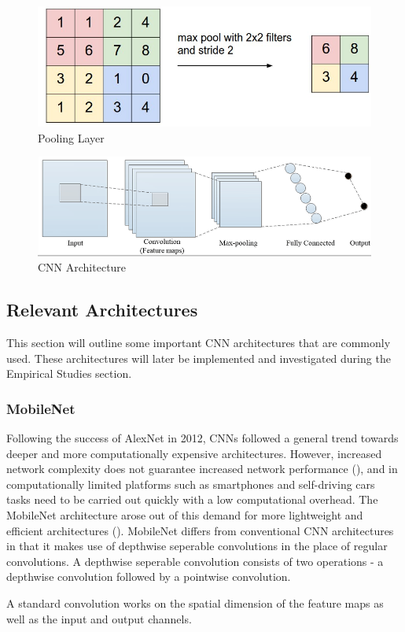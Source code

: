 \documentclass[12pt]{report}
\begin{document}
\vspace{0.5cm}
\begin{figure}[ht!]
	\centering
	\includegraphics[width=12cm]{pool}
	\caption{Pooling Layer}
	\label{fig:pool}
\end{figure}

\vspace{0.5cm}
\begin{figure}[ht!]
	\centering
	\includegraphics[width=12cm]{convo}
	\caption{CNN Architecture}
	\label{fig:convo}
\end{figure}

\newpage
\subsection{Relevant Architectures}
\begin{flushleft}
This section will outline some important CNN architectures that are commonly used. These architectures will later be implemented and investigated during the Empirical Studies section.
\end{flushleft}

\subsubsection{MobileNet}
\begin{flushleft}
Following the success of AlexNet in 2012, CNNs followed a general trend towards deeper and more computationally expensive architectures. However, increased network complexity does not guarantee increased network performance (\cite{szegedy2016rethinking}), and in computationally limited platforms such as smartphones and self-driving cars tasks need to be carried out quickly with a low computational overhead. The MobileNet architecture arose out of this demand for more lightweight and efficient architectures (\cite{howard2017mobilenets}). MobileNet differs from conventional CNN architectures in that it makes use of depthwise seperable convolutions in the place of regular convolutions. A depthwise seperable convolution consists of two operations - a depthwise convolution followed by a pointwise convolution.

A standard convolution works on the spatial dimension of the feature maps as well as the input and output channels.
\end{flushleft}
\end{document}
